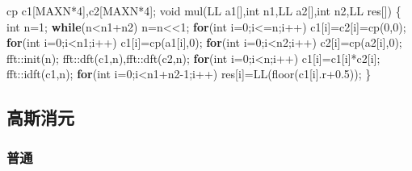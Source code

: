 \documentclass[
]{article}
\newenvironment{Shaded}{}{}
\newcommand{\ControlFlowTok}[1]{\textcolor[rgb]{0.00,0.44,0.13}{\textbf{#1}}}
\newcommand{\DataTypeTok}[1]{\textcolor[rgb]{0.56,0.13,0.00}{#1}}
\newcommand{\DecValTok}[1]{\textcolor[rgb]{0.25,0.63,0.44}{#1}}
\newcommand{\FloatTok}[1]{\textcolor[rgb]{0.25,0.63,0.44}{#1}}
\newcommand{\NormalTok}[1]{#1}
\begin{document}
\begin{Shaded}
\begin{Highlighting}[]
\NormalTok{cp c1[MAXN*}\DecValTok{4}\NormalTok{],c2[MAXN*}\DecValTok{4}\NormalTok{];}
\DataTypeTok{void}\NormalTok{ mul(LL a1[],}\DataTypeTok{int}\NormalTok{ n1,LL a2[],}\DataTypeTok{int}\NormalTok{ n2,LL res[])}
\NormalTok{\{}
    \DataTypeTok{int}\NormalTok{ n=}\DecValTok{1}\NormalTok{;}
    \ControlFlowTok{while}\NormalTok{(n\textless{}n1+n2) n=n\textless{}\textless{}}\DecValTok{1}\NormalTok{;}
    \ControlFlowTok{for}\NormalTok{(}\DataTypeTok{int}\NormalTok{ i=}\DecValTok{0}\NormalTok{;i\textless{}=n;i++) c1[i]=c2[i]=cp(}\DecValTok{0}\NormalTok{,}\DecValTok{0}\NormalTok{);}
    \ControlFlowTok{for}\NormalTok{(}\DataTypeTok{int}\NormalTok{ i=}\DecValTok{0}\NormalTok{;i\textless{}n1;i++) c1[i]=cp(a1[i],}\DecValTok{0}\NormalTok{);}
    \ControlFlowTok{for}\NormalTok{(}\DataTypeTok{int}\NormalTok{ i=}\DecValTok{0}\NormalTok{;i\textless{}n2;i++) c2[i]=cp(a2[i],}\DecValTok{0}\NormalTok{);}
\NormalTok{    fft::init(n);}
\NormalTok{    fft::dft(c1,n),fft::dft(c2,n);}
    \ControlFlowTok{for}\NormalTok{(}\DataTypeTok{int}\NormalTok{ i=}\DecValTok{0}\NormalTok{;i\textless{}n;i++) c1[i]=c1[i]*c2[i];}
\NormalTok{    fft::idft(c1,n);}
    \ControlFlowTok{for}\NormalTok{(}\DataTypeTok{int}\NormalTok{ i=}\DecValTok{0}\NormalTok{;i\textless{}n1+n2{-}}\DecValTok{1}\NormalTok{;i++)}
\NormalTok{        res[i]=LL(floor(c1[i].r+}\FloatTok{0.5}\NormalTok{));}
\NormalTok{\}}
\end{Highlighting}
\end{Shaded}

\hypertarget{ux9ad8ux65afux6d88ux5143}{%
\subsection{高斯消元}\label{ux9ad8ux65afux6d88ux5143}}

\hypertarget{ux666eux901a-1}{%
\subsubsection{普通}\label{ux666eux901a-1}}
\end{document}
